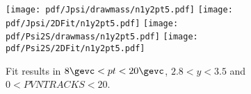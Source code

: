 \begin{figure}[H]
\begin{center}
\texttt{[image: pdf/Jpsi/drawmass/n1y2pt5.pdf]}
\texttt{[image: pdf/Jpsi/2DFit/n1y2pt5.pdf]}
\vspace*{-0.5cm}
\texttt{[image: pdf/Psi2S/drawmass/n1y2pt5.pdf]}
\texttt{[image: pdf/Psi2S/2DFit/n1y2pt5.pdf]}
\vspace*{-0.5cm}
\end{center}
\caption{Fit results in $8\gevc<pt<20\gevc$, $2.8<y<3.5$ and $0<PVNTRACKS<20$.}
\label{Fitn1y2pt5}
\end{figure}
